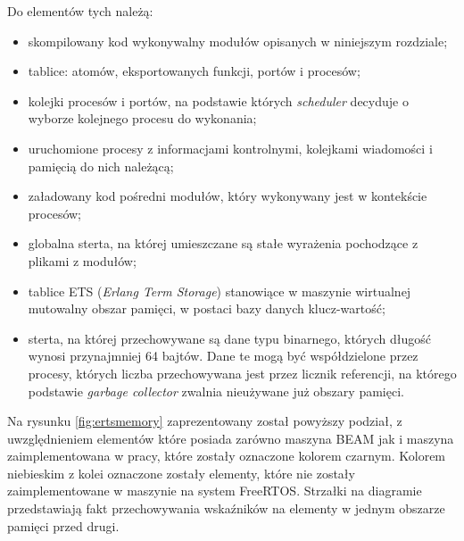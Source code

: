 Do elementów tych należą:
\begin{itemize}
\item skompilowany kod wykonywalny modułów opisanych w niniejszym rozdziale;
\item tablice: atomów, eksportowanych funkcji, portów i procesów;
\item kolejki procesów i portów, na podstawie których \emph{scheduler} decyduje o wyborze kolejnego procesu do wykonania;
\item uruchomione procesy z informacjami kontrolnymi, kolejkami wiadomości i pamięcią do nich należącą;
\item załadowany kod pośredni modułów, który wykonywany jest w kontekście procesów;
\item globalna sterta, na której umieszczane są stałe wyrażenia pochodzące z plikami z modułów;
\item tablice ETS (\emph{Erlang Term Storage}) stanowiące w maszynie wirtualnej mutowalny obszar pamięci, w postaci bazy danych klucz-wartość;
\item sterta, na której przechowywane są dane typu binarnego, których długość wynosi przynajmniej 64 bajtów. Dane te mogą być współdzielone przez procesy, których liczba przechowywana jest przez licznik referencji, na którego podstawie \emph{garbage collector} zwalnia nieużywane już obszary pamięci.
\end{itemize}

Na rysunku \ref{fig:ertsmemory} zaprezentowany został powyższy podział, z uwzględnieniem elementów które posiada zarówno maszyna BEAM jak i maszyna zaimplementowana w pracy, które zostały oznaczone kolorem czarnym.
Kolorem niebieskim z kolei oznaczone zostały elementy, które nie zostały zaimplementowane w maszynie na system FreeRTOS.
Strzałki na diagramie przedstawiają fakt przechowywania wskaźników na elementy w jednym obszarze pamięci przed drugi.

